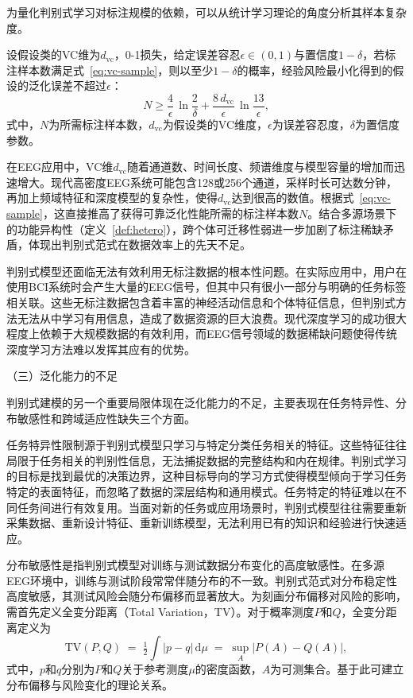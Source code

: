 为量化判别式学习对标注规模的依赖，可以从统计学习理论的角度分析其样本复杂度。

\begin{theorem}
\label{thm:sample}
设假设类的VC维为$d_{\mathrm{vc}}$，0-1损失，给定误差容忍$\epsilon \in (0,1)$与置信度$1-\delta$，若标注样本数满足式~\eqref{eq:vc-sample}，则以至少$1-\delta$的概率，经验风险最小化得到的假设的泛化误差不超过$\epsilon$：
\begin{equation}
\label{eq:vc-sample}
N \ge \frac{4}{\epsilon}\,\ln\!\frac{2}{\delta} + \frac{8\,d_{\mathrm{vc}}}{\epsilon}\,\ln\!\frac{13}{\epsilon},
\end{equation}
式中，$N$为所需标注样本数，$d_{\mathrm{vc}}$为假设类的VC维度，$\epsilon$为误差容忍度，$\delta$为置信度参数。
\end{theorem}

在EEG应用中，VC维$d_{\mathrm{vc}}$随着通道数、时间长度、频谱维度与模型容量的增加而迅速增大。现代高密度EEG系统可能包含128或256个通道，采样时长可达数分钟，再加上频域特征和深度模型的复杂性，使得$d_{\mathrm{vc}}$达到很高的数值。根据式~\eqref{eq:vc-sample}，这直接推高了获得可靠泛化性能所需的标注样本数$N$。结合多源场景下的功能异构性（定义~\ref{def:hetero}），跨个体可迁移性弱进一步加剧了标注稀缺矛盾，体现出判别式范式在数据效率上的先天不足。

判别式模型还面临无法有效利用无标注数据的根本性问题。在实际应用中，用户在使用BCI系统时会产生大量的EEG信号，但其中只有很小一部分与明确的任务标签相关联。这些无标注数据包含着丰富的神经活动信息和个体特征信息，但判别式方法无法从中学习有用信息，造成了数据资源的巨大浪费。现代深度学习的成功很大程度上依赖于大规模数据的有效利用，而EEG信号领域的数据稀缺问题使得传统深度学习方法难以发挥其应有的优势。

（三）泛化能力的不足

判别式建模的另一个重要局限体现在泛化能力的不足，主要表现在任务特异性、分布敏感性和跨域适应性缺失三个方面。

任务特异性限制源于判别式模型只学习与特定分类任务相关的特征。这些特征往往局限于任务相关的判别性信息，无法捕捉数据的完整结构和内在规律。判别式学习的目标是找到最优的决策边界，这种目标导向的学习方式使得模型倾向于学习任务特定的表面特征，而忽略了数据的深层结构和通用模式。任务特定的特征难以在不同任务间进行有效复用。当面对新的任务或应用场景时，判别式模型往往需要重新采集数据、重新设计特征、重新训练模型，无法利用已有的知识和经验进行快速适应。


分布敏感性是指判别式模型对训练与测试数据分布变化的高度敏感性。在多源EEG环境中，训练与测试阶段常常伴随分布的不一致。判别式范式对分布稳定性高度敏感，其测试风险会随分布偏移而显著放大。为刻画分布偏移对风险的影响，需首先定义全变分距离（Total Variation，TV）。对于概率测度$P$和$Q$，全变分距离定义为
\begin{equation}
\label{eq:tv-def}
\mathrm{TV}(P,Q) \;=\; \tfrac{1}{2}\int |p - q| \,\mathrm{d}\mu \;=\; \sup_{A} |P(A)-Q(A)|,
\end{equation}
式中，$p$和$q$分别为$P$和$Q$关于参考测度$\mu$的密度函数，$A$为可测集合。基于此可建立分布偏移与风险变化的理论关系。

